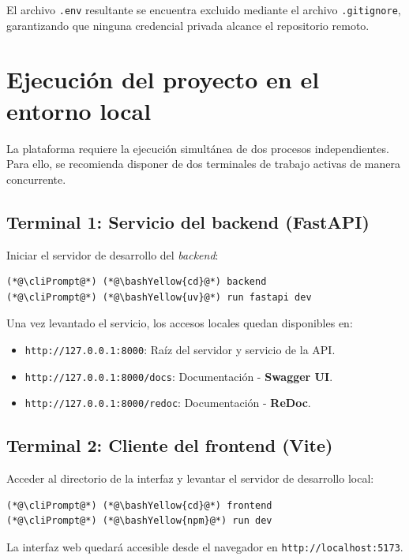 \begin{appendices}
El archivo \texttt{.env} resultante se encuentra excluido mediante el archivo \texttt{.gitignore}, garantizando que ninguna credencial privada alcance el repositorio remoto.

\section*{Ejecución del proyecto en el entorno local}\label{sec:manual_ejecucion}

La plataforma requiere la ejecución simultánea de dos procesos independientes. Para ello, se recomienda disponer de dos terminales de trabajo activas de manera concurrente.

\subsection*{Terminal 1: Servicio del backend (FastAPI)}
Iniciar el servidor de desarrollo del \textit{backend}:

\begin{lstlisting}
(*@\cliPrompt@*) (*@\bashYellow{cd}@*) backend
(*@\cliPrompt@*) (*@\bashYellow{uv}@*) run fastapi dev        
\end{lstlisting}

Una vez levantado el servicio, los accesos locales quedan disponibles en:
\begin{itemize}
    \item \texttt{http://127.0.0.1:8000}: Raíz del servidor y servicio de la API.
    \item \texttt{http://127.0.0.1:8000/docs}: Documentación - \textbf{Swagger UI}.
    \item \texttt{http://127.0.0.1:8000/redoc}: Documentación - \textbf{ReDoc}.
\end{itemize}

\subsection*{Terminal 2: Cliente del frontend (Vite)}
Acceder al directorio de la interfaz y levantar el servidor de desarrollo local:

\begin{lstlisting}
(*@\cliPrompt@*) (*@\bashYellow{cd}@*) frontend
(*@\cliPrompt@*) (*@\bashYellow{npm}@*) run dev               
\end{lstlisting}

La interfaz web quedará accesible desde el navegador en \texttt{http://localhost:5173}.


\end{appendices}
